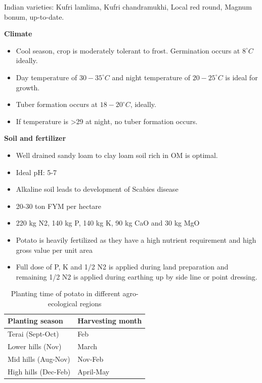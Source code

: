 \documentclass[
  openany]{book}
\providecommand{\tightlist}{%
  \setlength{\itemsep}{0pt}\setlength{\parskip}{0pt}}
\begin{document}
Indian varieties: Kufri lamlima, Kufri chandramukhi, Local red round, Magnum bonum, up-to-date.

\textbf{Climate}

\begin{itemize}
\tightlist
\item
  Cool season, crop is moderately tolerant to frost. Germination occurs at \(8^\circ C\) ideally.
\item
  Day temperature of \(30-35^\circ C\) and night temperature of \(20-25^\circ C\) is ideal for growth.
\item
  Tuber formation occurs at \(18-20^\circ C\), ideally.
\item
  If temperature is \textgreater29 at night, no tuber formation occurs.
\end{itemize}

\textbf{Soil and fertilizer}

\begin{itemize}
\tightlist
\item
  Well drained sandy loam to clay loam soil rich in OM is optimal.
\item
  Ideal pH: 5-7
\item
  Alkaline soil leads to development of Scabies disease
\item
  20-30 ton FYM per hectare
\item
  220 kg N2, 140 kg P, 140 kg K, 90 kg CaO and 30 kg MgO
\item
  Potato is heavily fertilized as they have a high nutrient requirement and high gross value per unit area
\item
  Full dose of P, K and 1/2 N2 is applied during land preparation and remaining 1/2 N2 is applied during earthing up by side line or point dressing.
\end{itemize}

\begin{table}

\caption{\label{tab:planting-time}Planting time of potato in different agro-ecological regions}
\centering
\begin{tabular}[t]{l|l}
\hline
Planting season & Harvesting month\\
\hline
Terai (Sept-Oct) & Feb\\
\hline
Lower hills (Nov) & March\\
\hline
Mid hills (Aug-Nov) & Nov-Feb\\
\hline
High hills (Dec-Feb) & April-May\\
\hline
\end{tabular}
\end{table}
\end{document}
